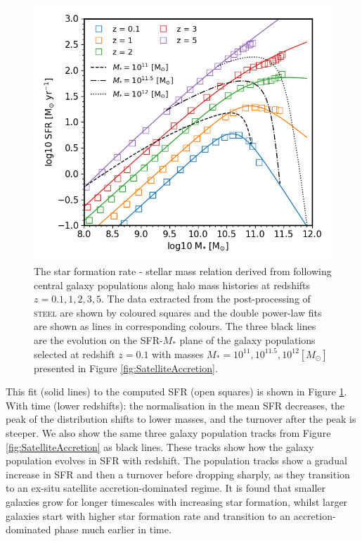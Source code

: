 \begin{figure}[h]
	\centering
	\includegraphics[width = 0.8\linewidth]{Figures/Chapter4/HMC_DPL.png}
    \caption{The star formation rate - stellar mass relation derived from following central galaxy populations along halo mass histories at redshifts $z = 0.1, 1, 2, 3, 5$. The data extracted from the post-processing of \textsc{steel} are shown by coloured squares and the double power-law fits are shown as lines in corresponding colours. The three black lines are the evolution on the SFR-$M_{*}$ plane of the galaxy populations selected at redshift $z=0.1$ with masses $M_* = 10^{11}, 10^{11.5}, 10^{12} [M_{\odot}]$  presented in Figure \ref{fig:SatelliteAccretion}.}
	\label{fig:SFR_DPL}
\end{figure}

This fit (solid lines) to the computed SFR (open squares) is shown in Figure \ref{fig:SFR_DPL}. With time (lower redshifts): the normalisation in the mean SFR decreases, the peak of the distribution shifts to lower masses, and the turnover after the peak is steeper. We also show the same three galaxy population tracks from Figure \ref{fig:SatelliteAccretion} as black lines. These tracks show how the galaxy population evolves in SFR with redshift. The population tracks show a gradual increase in SFR and then a turnover before dropping sharply, as they transition to an ex-situ satellite accretion-dominated regime. It is found that smaller galaxies grow for longer timescales with increasing star formation, whilst larger galaxies start with higher star formation rate and transition to an accretion-dominated phase much earlier in time.

